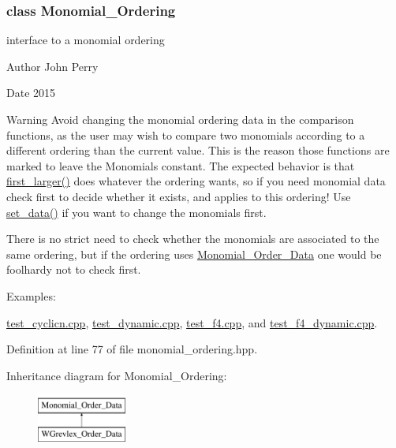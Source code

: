 \subsubsection{class Monomial\+\_\+\+Ordering}
interface to a monomial ordering 

\begin{DoxyAuthor}{Author}
John Perry 
\end{DoxyAuthor}
\begin{DoxyDate}{Date}
2015 
\end{DoxyDate}
\begin{DoxyWarning}{Warning}
Avoid changing the monomial ordering data in the comparison functions, as the user may wish to compare two monomials according to a different ordering than the current value. This is the reason those functions are marked to leave the Monomials constant. The expected behavior is that \hyperlink{group__orderinggroup_aed41fe82e1ca5cd287a93d287fee7c20}{first\+\_\+larger()} does whatever the ordering wants, so if you need monomial data check first to decide whether it exists, and applies to this ordering! Use \hyperlink{group__orderinggroup_a22b08dffd1cdf3a655ca18d604cfcee1}{set\+\_\+data()} if you want to change the monomials first.

There is no strict need to check whether the monomials are associated to the same ordering, but if the ordering uses \hyperlink{group__orderinggroup_class_monomial___order___data}{Monomial\+\_\+\+Order\+\_\+\+Data} one would be foolhardy not to check first. 
\end{DoxyWarning}
\begin{Desc}
\item[Examples\+: ]\par
\hyperlink{test_cyclicn_8cpp-example}{test\+\_\+cyclicn.\+cpp}, \hyperlink{test_dynamic_8cpp-example}{test\+\_\+dynamic.\+cpp}, \hyperlink{test_f4_8cpp-example}{test\+\_\+f4.\+cpp}, and \hyperlink{test_f4_dynamic_8cpp-example}{test\+\_\+f4\+\_\+dynamic.\+cpp}.\end{Desc}


Definition at line 77 of file monomial\+\_\+ordering.\+hpp.

Inheritance diagram for Monomial\+\_\+\+Ordering\+:\begin{figure}[H]
\begin{center}
\leavevmode
\includegraphics[height=1.581921cm]{group__orderinggroup}
\end{center}
\end{figure}
